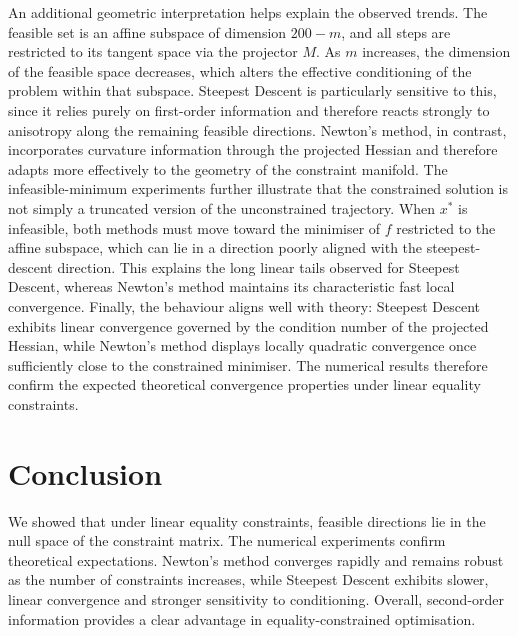 \documentclass[11pt,a4paper]{article}
\begin{document}
\newline
\newline
An additional geometric interpretation helps explain the observed trends. 
The feasible set is an affine subspace of dimension $200-m$, and all steps are restricted to its tangent space via the projector $M$. 
As $m$ increases, the dimension of the feasible space decreases, which alters the effective conditioning of the problem within that subspace. 
Steepest Descent is particularly sensitive to this, since it relies purely on first-order information and therefore reacts strongly to anisotropy along the remaining feasible directions. 
Newton’s method, in contrast, incorporates curvature information through the projected Hessian and therefore adapts more effectively to the geometry of the constraint manifold. The infeasible-minimum experiments further illustrate that the constrained solution is not simply a truncated version of the unconstrained trajectory. 
When $x^*$ is infeasible, both methods must move toward the minimiser of $f$ restricted to the affine subspace, which can lie in a direction poorly aligned with the steepest-descent direction. 
This explains the long linear tails observed for Steepest Descent, whereas Newton’s method maintains its characteristic fast local convergence. Finally, the behaviour aligns well with theory: Steepest Descent exhibits linear convergence governed by the condition number of the projected Hessian, while Newton’s method displays locally quadratic convergence once sufficiently close to the constrained minimiser. The numerical results therefore confirm the expected theoretical convergence properties under linear equality constraints.

\section{Conclusion}

We showed that under linear equality constraints, feasible directions lie in the null space of the constraint matrix. 
The numerical experiments confirm theoretical expectations. Newton’s method converges rapidly and remains robust as the number of constraints increases, while Steepest Descent exhibits slower, linear convergence and stronger sensitivity to conditioning. 
Overall, second-order information provides a clear advantage in equality-constrained optimisation.
\end{document}

